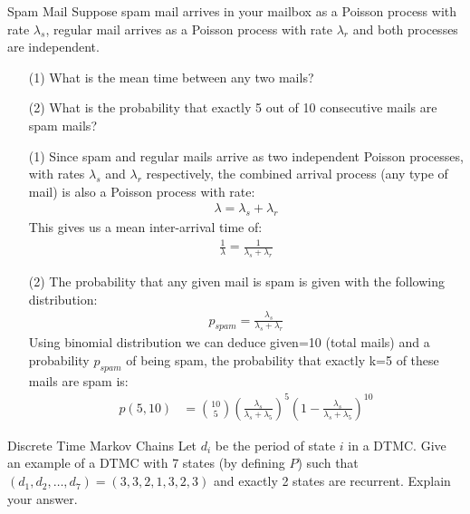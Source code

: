 \begin{problem}{Spam Mail}
Suppose spam mail arrives in your mailbox as a Poisson process with rate $\lambda_s$, regular mail arrives as a Poisson process with rate $\lambda_r$ and both processes are independent. 
\begin{itemize}
	\item[(1)] What is the mean time between any two mails? 
	\item[(2)] What is the probability that exactly 5 out of 10 consecutive mails are spam mails?
\end{itemize}
 \end{problem}

 \begin{solution}
	 \begin{itemize}
		 \item[(1)] Since spam and regular mails arrive as two independent Poisson processes, with rates $\lambda_s$ and $\lambda_r$ respectively, the combined arrival process (any type of mail) is also a Poisson process with rate:
 \begin{align*}
     \lambda= \lambda_s +\lambda_r
 \end{align*}
 This gives us a mean inter-arrival time of:
 \begin{align*}
    \frac{1}{\lambda}= \frac{1}{\lambda_s +\lambda_r}
 \end{align*}

 \item[(2)] The probability that any given mail is spam is given with the following distribution:
 \begin{align*}
     p_{spam}=\frac{\lambda_s}{\lambda_s +\lambda_r}
 \end{align*}
			 Using binomial distribution we can deduce given=10 (total mails) and a probability $p_{spam}$ of being spam, the probability that exactly k=5 of these mails are spam is:
\begin{align*}
    p(5,10)&=\binom{10}{5} \left (\frac{\lambda_s}{\lambda_s +\lambda_5}\right )^5 \left ( 1- \frac{\lambda_s}{\lambda_s +\lambda_5} \right ) ^{10}
\end{align*}
	 \end{itemize}
\end{solution}

\begin{problem}{Discrete Time Markov Chains} 
Let \( d_i \) be the period of state \( i \) in a DTMC. Give an example of a DTMC with 7 states (by defining \( P \)) such that \( (d_1, d_2, \dots, d_7) = (3, 3, 2, 1, 3, 2, 3) \) and exactly 2 states are recurrent. Explain your answer.
\end{problem}

